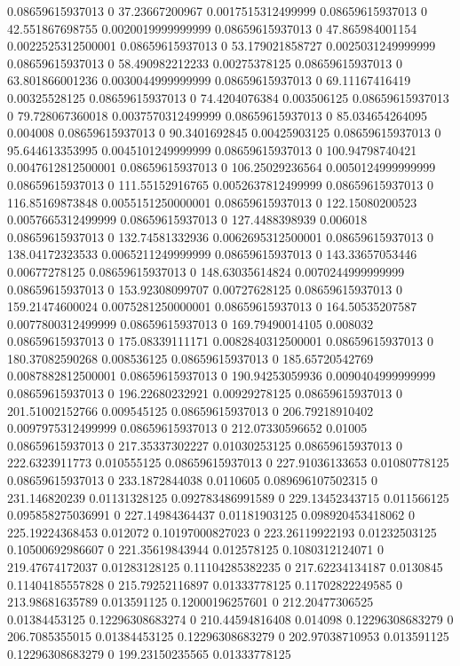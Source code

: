0.08659615937013 0 37.23667200967 0.0017515312499999
0.08659615937013 0 42.551867698755 0.0020019999999999
0.08659615937013 0 47.865984001154 0.0022525312500001
0.08659615937013 0 53.179021858727 0.0025031249999999
0.08659615937013 0 58.490982212233 0.00275378125
0.08659615937013 0 63.801866001236 0.0030044999999999
0.08659615937013 0 69.11167416419 0.00325528125
0.08659615937013 0 74.4204076384 0.003506125
0.08659615937013 0 79.728067360018 0.0037570312499999
0.08659615937013 0 85.034654264095 0.004008
0.08659615937013 0 90.3401692845 0.00425903125
0.08659615937013 0 95.644613353995 0.0045101249999999
0.08659615937013 0 100.94798740421 0.0047612812500001
0.08659615937013 0 106.25029236564 0.0050124999999999
0.08659615937013 0 111.55152916765 0.0052637812499999
0.08659615937013 0 116.85169873848 0.0055151250000001
0.08659615937013 0 122.15080200523 0.0057665312499999
0.08659615937013 0 127.4488398939 0.006018
0.08659615937013 0 132.74581332936 0.0062695312500001
0.08659615937013 0 138.04172323533 0.0065211249999999
0.08659615937013 0 143.33657053446 0.00677278125
0.08659615937013 0 148.63035614824 0.0070244999999999
0.08659615937013 0 153.92308099707 0.00727628125
0.08659615937013 0 159.21474600024 0.0075281250000001
0.08659615937013 0 164.50535207587 0.0077800312499999
0.08659615937013 0 169.79490014105 0.008032
0.08659615937013 0 175.08339111171 0.0082840312500001
0.08659615937013 0 180.37082590268 0.008536125
0.08659615937013 0 185.65720542769 0.0087882812500001
0.08659615937013 0 190.94253059936 0.0090404999999999
0.08659615937013 0 196.22680232921 0.00929278125
0.08659615937013 0 201.51002152766 0.009545125
0.08659615937013 0 206.79218910402 0.0097975312499999
0.08659615937013 0 212.07330596652 0.01005
0.08659615937013 0 217.35337302227 0.01030253125
0.08659615937013 0 222.6323911773 0.010555125
0.08659615937013 0 227.91036133653 0.01080778125
0.08659615937013 0 233.1872844038 0.0110605
0.089696107502315 0 231.146820239 0.01131328125
0.092783486991589 0 229.13452343715 0.011566125
0.095858275036991 0 227.14984364437 0.01181903125
0.098920453418062 0 225.19224368453 0.012072
0.10197000827023 0 223.26119922193 0.01232503125
0.10500692986607 0 221.35619843944 0.012578125
0.1080312124071 0 219.47674172037 0.01283128125
0.11104285382235 0 217.62234134187 0.0130845
0.11404185557828 0 215.79252116897 0.01333778125
0.11702822249585 0 213.98681635789 0.013591125
0.12000196257601 0 212.20477306525 0.01384453125
0.12296308683274 0 210.44594816408 0.014098
0.12296308683279 0 206.7085355015 0.01384453125
0.12296308683279 0 202.97038710953 0.013591125
0.12296308683279 0 199.23150235565 0.01333778125

